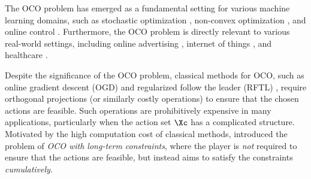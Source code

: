 The OCO problem has emerged as a fundamental setting for various machine learning domains, such as stochastic optimization \cite{cesa2004generalization},  non-convex optimization \cite{cutkosky2023optimal}, and online control \cite{agarwal2019online}.
Furthermore, the OCO problem is directly relevant to various real-world settings, including online advertising \cite{mcmahan2013ad}, internet of things \cite{chen2018bandit}, and healthcare \cite{tewari2017ads}.

Despite the significance of the OCO problem, classical methods for OCO, such as online gradient descent (OGD) \citep{zinkevich2003online} and regularized follow the leader (RFTL) \citep{shalev2007primal}, require orthogonal projections (or similarly costly operations) to ensure that the chosen actions are feasible.
Such operations are prohibitively expensive in many applications, particularly when the action set $\Xc$ has a complicated structure.
Motivated by the high computation cost of classical methods, \citet{mahdavi2012trading} introduced the problem of \emph{OCO with long-term constraints}, where the player is \emph{not} required to ensure that the actions are feasible, but instead aims to satisfy the constraints \emph{cumulatively}.


